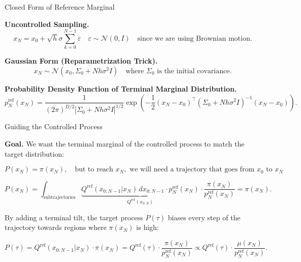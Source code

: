 \documentclass[aspectratio=169,xcolor=dvipsnames]{beamer}
\begin{document}
\begin{frame}{Closed Form of Reference Marginal}
\footnotesize

\textbf{Uncontrolled Sampling.}
\[
x_N = x_0 + \sqrt{h} \sigma \sum_{k=0}^{N-1} \varepsilon \quad \varepsilon \sim \mathcal{N}(0, I) \quad \text{since we are using Brownian motion}.
\]

\textbf{Gaussian Form (Reparametrization Trick).}
\[
x_N \sim \mathcal{N}(x_0, \Sigma_0 + N h \sigma^2 I) \quad \text{where } \Sigma_0 \text{ is the initial covariance.}
\]

\textbf{Probability Density Function of Terminal Marginal Distribution.}
\[
p^{\text{ref}}_N(x_N) = \frac{1}{(2\pi)^{D/2} |\Sigma_0 + N h \sigma^2 I|^{1/2}} \exp\left( -\frac{1}{2} (x_N - x_0)^\top (\Sigma_0 + N h \sigma^2 I)^{-1} (x_N - x_0) \right).
\]

\end{frame}


\begin{frame}{Guiding the Controlled Process}
\footnotesize

\textbf{Goal.} We want the terminal marginal of the controlled process to match the target distribution:

\[
P(x_N) = \pi(x_N), \quad \text{but to reach } x_N, \text{ we will need a trajectory that goes from } x_0 \text{ to } x_N
\]

\medskip


\[
P(x_N) = \int_{\text{subtrajectories}} \underbrace{Q^{\text{ref}}(x_{0:N-1} | x_N) \, dx_{0:N-1} \cdot p_N^{\text{ref}}(x_N)}_{Q^{\text{ref}}(x_{0:N})} \cdot \frac{\pi(x_N)}{p_N^{\text{ref}}(x_N)} = \pi(x_N).
\]

\medskip

By adding a terminal tilt, the target process $P(\tau)$ biases every step of the trajectory towards regions where $\pi(x_N)$ is high:

\[
P(\tau) = Q^{\text{ref}}(x_{0:N-1} | x_N) \cdot \pi(x_N) = Q^{\text{ref}}(\tau) \cdot \frac{\pi(x_N)}{p_N^{\text{ref}}(x_N)} \propto Q^{\text{ref}}(\tau) \cdot \frac{\mu(x_N)}{p_N^{\text{ref}}(x_N)}.
\]


\end{frame}
\end{document}
